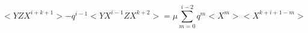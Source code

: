 \begin{equation}
<YZ X^{i+k+1}>- q^{i-1}  <Y X^{i-1} Z X^{k+2}>=
\mu \sum_{m=0}^{i-2} q^m <X^m><X^{k+i+1-m}>
\end{equation}


